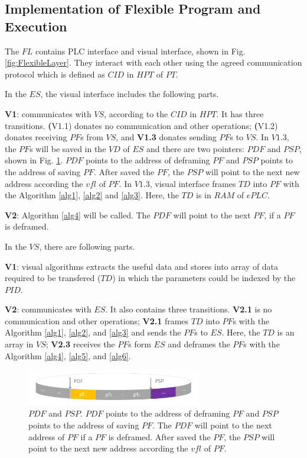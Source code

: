 \documentclass[journal,UTF8]{IEEEtran}
\begin{document}
\subsection{Implementation of Flexible Program and Execution}
The $FL$ contains PLC interface and visual interface, shown in Fig. \ref{fig:FlexibleLayer}. They interact with each other using the agreed communication protocol which is defined as $CID$ in $HPT$ of $PT$. 

In the $ES$, the visual interface includes the following parts.

\textbf{V1}: communicates with $VS$, according to the $CID$ in $HPT$. It has three transitions. \textbf(V1.1) donates no communication and other operations; \textbf(V1.2) donates receiving $PF$s from $VS$, and \textbf{V1.3} donates sending $PF$s to $VS$. In $V1.3$, the $PF$s will be saved in the $VD$ of $ES$ and there are two pointers: $PDF$ and $PSP$, shown in Fig. \ref{fig:VisualInterface}. $PDF$ points to the address of deframing $PF$ and $PSP$ points to the address of saving $PF$. After saved the $PF$, the $PSP$ will point to the next new address according the $vfl$ of $PF$. In $V1.3$, visual interface frames $TD$ into $PF$ with the Algorithm \ref{alg1}, \ref{alg2} and \ref{alg3}. Here, the $TD$ is in $RAM$ of $ePLC$.

\textbf{V2}: Algorithm \ref{alg4} will be called. The $PDF$ will point to the next $PF$, if a $PF$ is deframed.


In the $VS$, there are following parts.  

\textbf{V1}: visual algorithms extracts the useful data and stores into array of data required to be transfered ($TD$) in which the parameters could be indexed by the $PID$.

\textbf{V2}: communicates with $ES$. It also contains three transitions. \textbf{V2.1} is no communication and other operations; \textbf{V2.1} frames $TD$ into $PF$s with the Algorithm \ref{alg1}, \ref{alg2}, and \ref{alg3} and sends the $PF$s to $ES$. Here, the $TD$ is an array in $VS$; \textbf{V2.3} receives the $PF$s form $ES$ and deframes the $PF$s with the Algorithm \ref{alg4}, \ref{alg5}, and \ref{alg6}.

\begin{figure}
	\centering
	\includegraphics[width=3in]{fig/VisualInterface.pdf}
	\caption{ $PDF$ and $PSP$. $PDF$ points to the address of deframing $PF$ and $PSP$ points to the address of saving $PF$. The $PDF$ will point to the next address of $PF$ if a $PF$ is deframed. After saved the $PF$, the $PSP$ will point to the next new address according the $vfl$ of $PF$.}
	\label{fig:VisualInterface}
\end{figure}
\end{document}
